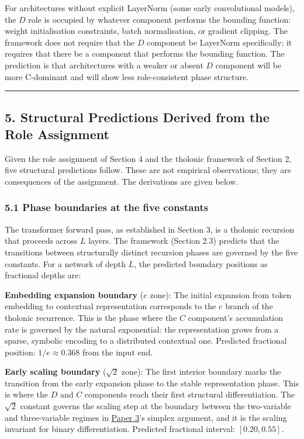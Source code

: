 \documentclass[
  11pt,
  letterpaper,
]{article}
\begin{document}
For architectures without explicit LayerNorm (some early convolutional
models), the \(D\) role is occupied by whatever component performs the
bounding function: weight initialisation constraints, batch
normalisation, or gradient clipping. The framework does not require that
the \(D\) component be LayerNorm specifically; it requires that there be
a component that performs the bounding function. The prediction is that
architectures with a weaker or absent \(D\) component will be more
C-dominant and will show less role-consistent phase structure.

\begin{center}\rule{0.5\linewidth}{0.5pt}\end{center}

\subsection{5. Structural Predictions Derived from the Role
Assignment}\label{structural-predictions-derived-from-the-role-assignment}

Given the role assignment of Section 4 and the tholonic framework of
Section 2, five structural predictions follow. These are not empirical
observations; they are consequences of the assignment. The derivations
are given below.

\subsubsection{5.1 Phase boundaries at the five
constants}\label{phase-boundaries-at-the-five-constants}

The transformer forward pass, as established in Section 3, is a tholonic
recursion that proceeds across \(L\) layers. The framework (Section 2.3)
predicts that the transitions between structurally distinct recursion
phases are governed by the five constants. For a network of depth \(L\),
the predicted boundary positions as fractional depths are:

\textbf{Embedding expansion boundary} (\(e\) zone): The initial
expansion from token embedding to contextual representation corresponds
to the \(e\) branch of the tholonic recurrence. This is the phase where
the \(C\) component's accumulation rate is governed by the natural
exponential: the representation grows from a sparse, symbolic encoding
to a distributed contextual one. Predicted fractional position:
\(1/e \approx 0.368\) from the input end.

\textbf{Early scaling boundary} (\(\sqrt{2}\) zone): The first interior
boundary marks the transition from the early expansion phase to the
stable representation phase. This is where the \(D\) and \(C\)
components reach their first structural differentiation. The
\(\sqrt{2}\) constant governs the scaling step at the boundary between
the two-variable and three-variable regimes in
\href{https://github.com/baardev/truevalue/blob/main/docnav/Research/papers/3_minimal-recursive-triadic-framework/3_minimal-recursive-triadic-framework.pdf}{Paper
3}'s simplex argument, and it is the scaling invariant for binary
differentiation. Predicted fractional interval: \([0.20, 0.55]\).
\end{document}
